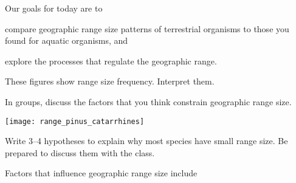 \documentclass[t]{beamer}
\begin{document}

\begin{frame}[t]{Our goals for today are to }

	
	\hangpara compare geographic range size patterns of terrestrial organisms to those you found for aquatic organisms, and
	
	\hangpara explore the processes that regulate the geographic range.

\end{frame}

{
\begin{frame}[t]{These figures show range size frequency. Interpret them.}

\end{frame}
}

%
%
%


\begin{frame}[t]{In groups, discuss the factors that you think constrain geographic range size.}

	\begin{center}
		\texttt{[image: range\_pinus\_catarrhines]}
	\end{center}
	
	\hangpara Write 3–4 hypotheses to explain why most species have small range size. Be prepared to discuss them with the class.
	
\end{frame}


\begin{frame}[t]{Factors that influence geographic range size include}

	\hangpara {} 
	
	\hangpara {}
	
	\hangpara {}

	\hangpara {}
	
		
\end{frame}
\end{document}
